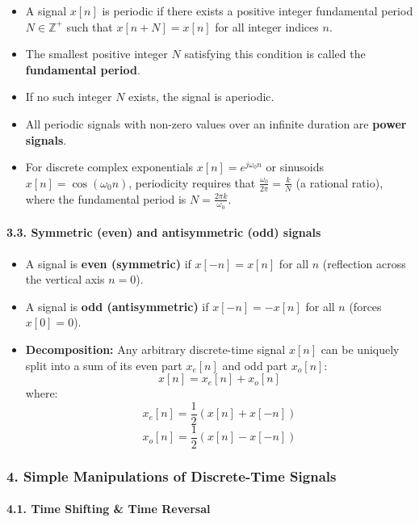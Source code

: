 \begin{itemize}
\tightlist
\item
  A signal \(x[n]\) is periodic if there exists a positive integer
  fundamental period \(N \in \mathbb{Z}^+\) such that
  \(x[n + N] = x[n]\) for all integer indices \(n\).
\item
  The smallest positive integer \(N\) satisfying this condition is
  called the \textbf{fundamental period}.
\item
  If no such integer \(N\) exists, the signal is aperiodic.
\item
  All periodic signals with non-zero values over an infinite duration
  are \textbf{power signals}.
\item
  For discrete complex exponentials \(x[n] = e^{j\omega_0 n}\) or
  sinusoids \(x[n] = \cos(\omega_0 n)\), periodicity requires that
  \(\frac{\omega_0}{2\pi} = \frac{k}{N}\) (a rational ratio), where the
  fundamental period is \(N = \frac{2\pi k}{\omega_0}\).
\end{itemize}

\paragraph{3.3. Symmetric (even) and antisymmetric (odd)
signals}\label{symmetric-even-and-antisymmetric-odd-signals}

\begin{itemize}
\tightlist
\item
  A signal is \textbf{even (symmetric)} if \(x[-n] = x[n]\) for all
  \(n\) (reflection across the vertical axis \(n = 0\)).
\item
  A signal is \textbf{odd (antisymmetric)} if \(x[-n] = -x[n]\) for all
  \(n\) (forces \(x[0] = 0\)).
\item
  \textbf{Decomposition:} Any arbitrary discrete-time signal \(x[n]\)
  can be uniquely split into a sum of its even part \(x_e[n]\) and odd
  part \(x_o[n]\): \[x[n] = x_e[n] + x_o[n]\] where:
  \[x_e[n] = \frac{1}{2}(x[n] + x[-n])\]
  \[x_o[n] = \frac{1}{2}(x[n] - x[-n])\]
\end{itemize}

\subsubsection{4. Simple Manipulations of Discrete-Time
Signals}\label{simple-manipulations-of-discrete-time-signals}

\paragraph{4.1. Time Shifting \& Time
Reversal}\label{time-shifting-time-reversal}


